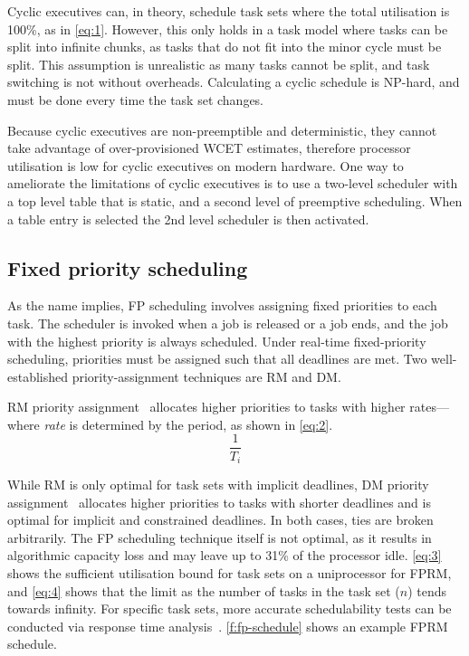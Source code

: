 Cyclic executives can, in theory, schedule task sets where the total utilisation is 100\%, as in \cref{eq:1}.
However, this only holds
in a task model where tasks can be split into infinite chunks, as tasks that do not fit into the
minor cycle must be split. This assumption is unrealistic as many tasks
cannot be split, and task switching is not without overheads. Calculating a cyclic schedule is
NP-hard, and must be done every time the task set changes.

Because cyclic executives are non-preemptible and deterministic, they cannot take advantage of 
over-provisioned \gls{WCET} estimates, therefore processor utilisation is low
for cyclic executives on modern hardware. 
One way to ameliorate the limitations of cyclic executives is to use a two-level scheduler with a
top level table that is static, and a second level of preemptive scheduling. When a table entry is
selected the 2nd level scheduler is then activated.

\subsection{Fixed priority scheduling}
\label{s:fp}

As the name implies, \gls{FP} scheduling involves assigning fixed priorities to each task.
The scheduler is invoked when a job is released or a job ends, and the job with the highest priority is
always scheduled. Under real-time fixed-priority scheduling, priorities must be assigned such that
all deadlines are met. Two well-established priority-assignment techniques are \gls{RM} and
\gls{DM}.


\Gls{RM} priority assignment~\citep{Liu_Layland_73} allocates higher priorities to tasks with higher
rates---where \emph{rate} is determined by the period, as shown in \cref{eq:2}.
\begin{equation}
    \label{eq:2}
	\dfrac{1}{T_{i}}
\end{equation}

While \gls{RM} is only optimal for task sets with implicit deadlines, \gls{DM} priority
assignment~\citep{Leung_Whitehead_82} allocates higher priorities to tasks with shorter deadlines
and is optimal for implicit and constrained deadlines.
In both cases, ties are broken arbitrarily.
The \gls{FP} scheduling technique itself is not optimal, as it results in algorithmic capacity loss
and may leave up to 31\% of the processor idle. \cref{eq:3} shows the sufficient utilisation bound
for task sets on a uniprocessor for \gls{FPRM}, and \cref{eq:4} shows that the limit as the number of tasks in the task set ($n$) tends
towards infinity. For specific task sets, more accurate schedulability tests can be conducted via
response time analysis~\citep{Audsley_NRTW_93}.
\cref{f:fp-schedule} shows an example \gls{FPRM} schedule.


